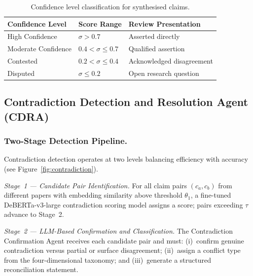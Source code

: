 \documentclass{llncs}
\begin{document}
\begin{table}[htbp]
\centering
\caption{Confidence level classification for synthesised claims.}
\label{tab:confidence}
\begin{tabular}{lll}
\toprule
\textbf{Confidence Level} & \textbf{Score Range} & \textbf{Review Presentation} \\
\midrule
High Confidence    & $\sigma > 0.7$             & Asserted directly         \\
Moderate Confidence & $0.4 < \sigma \leq 0.7$  & Qualified assertion       \\
Contested          & $0.2 < \sigma \leq 0.4$    & Acknowledged disagreement \\
Disputed           & $\sigma \leq 0.2$          & Open research question    \\
\bottomrule
\end{tabular}
\end{table}

\subsection{Contradiction Detection and Resolution Agent (CDRA)}

\subsubsection{Two-Stage Detection Pipeline.}

Contradiction detection operates at two levels balancing efficiency with
accuracy (see Figure~\ref{fig:contradiction}).

\textit{Stage~1 — Candidate Pair Identification.}
For all claim pairs $(c_a, c_b)$ from different papers with embedding
similarity above threshold $\theta_1$, a fine-tuned DeBERTa-v3-large
contradiction scoring model assigns a score; pairs exceeding $\tau$ advance
to Stage~2.

\textit{Stage~2 — LLM-Based Confirmation and Classification.}
The Contradiction Confirmation Agent receives each candidate pair and must:
(i)~confirm genuine contradiction versus partial or surface disagreement;
(ii)~assign a conflict type from the four-dimensional taxonomy; and
(iii)~generate a structured reconciliation statement.
\end{document}
